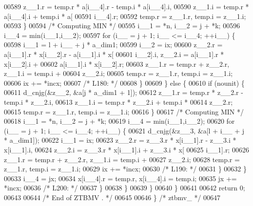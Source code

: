 \begin{DoxyCode}
00589                 z\_\_1.r = temp.r * a[i\_\_4].r - temp.i * a[i\_\_4].i, 
00590                     z\_\_1.i = temp.r * a[i\_\_4].i + temp.i * a[
00591                     i\_\_4].r;
00592                 temp.r = z\_\_1.r, temp.i = z\_\_1.i;
00593             \}
00594 \textcolor{comment}{/* Computing MIN */}
00595             i\_\_1 = *n, i\_\_2 = j + *k;
00596             i\_\_4 = min(i\_\_1,i\_\_2);
00597             \textcolor{keywordflow}{for} (i\_\_ = j + 1; i\_\_ <= i\_\_4; ++i\_\_) \{
00598                 i\_\_1 = l + i\_\_ + j * a\_dim1;
00599                 i\_\_2 = ix;
00600                 z\_\_2.r = a[i\_\_1].r * x[i\_\_2].r - a[i\_\_1].i * x[
00601                     i\_\_2].i, z\_\_2.i = a[i\_\_1].r * x[i\_\_2].i + 
00602                     a[i\_\_1].i * x[i\_\_2].r;
00603                 z\_\_1.r = temp.r + z\_\_2.r, z\_\_1.i = temp.i + 
00604                     z\_\_2.i;
00605                 temp.r = z\_\_1.r, temp.i = z\_\_1.i;
00606                 ix += *incx;
00607 \textcolor{comment}{/* L180: */}
00608             \}
00609             \} \textcolor{keywordflow}{else} \{
00610             \textcolor{keywordflow}{if} (nounit) \{
00611                 d\_cnjg(&z\_\_2, &a[j * a\_dim1 + 1]);
00612                 z\_\_1.r = temp.r * z\_\_2.r - temp.i * z\_\_2.i, 
00613                     z\_\_1.i = temp.r * z\_\_2.i + temp.i * 
00614                     z\_\_2.r;
00615                 temp.r = z\_\_1.r, temp.i = z\_\_1.i;
00616             \}
00617 \textcolor{comment}{/* Computing MIN */}
00618             i\_\_1 = *n, i\_\_2 = j + *k;
00619             i\_\_4 = min(i\_\_1,i\_\_2);
00620             \textcolor{keywordflow}{for} (i\_\_ = j + 1; i\_\_ <= i\_\_4; ++i\_\_) \{
00621                 d\_cnjg(&z\_\_3, &a[l + i\_\_ + j * a\_dim1]);
00622                 i\_\_1 = ix;
00623                 z\_\_2.r = z\_\_3.r * x[i\_\_1].r - z\_\_3.i * x[i\_\_1].i, 
00624                     z\_\_2.i = z\_\_3.r * x[i\_\_1].i + z\_\_3.i * x[
00625                     i\_\_1].r;
00626                 z\_\_1.r = temp.r + z\_\_2.r, z\_\_1.i = temp.i + 
00627                     z\_\_2.i;
00628                 temp.r = z\_\_1.r, temp.i = z\_\_1.i;
00629                 ix += *incx;
00630 \textcolor{comment}{/* L190: */}
00631             \}
00632             \}
00633             i\_\_4 = jx;
00634             x[i\_\_4].r = temp.r, x[i\_\_4].i = temp.i;
00635             jx += *incx;
00636 \textcolor{comment}{/* L200: */}
00637         \}
00638         \}
00639     \}
00640     \}
00641 
00642     \textcolor{keywordflow}{return} 0;
00643 
00644 \textcolor{comment}{/*     End of ZTBMV . */}
00645 
00646 \} \textcolor{comment}{/* ztbmv\_ */}
00647 
\end{DoxyCode}
